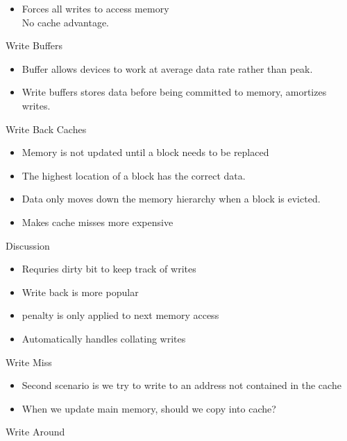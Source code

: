 \documentclass{report}
\begin{document}
\begin{description}
\begin{itemize}
            \item Forces all writes to access memory\\
                No cache advantage.
        \end{itemize}
    \item {\large Write Buffers}
        \begin{itemize}
            \item Buffer allows devices to work at average
                data rate rather than peak.
            \item Write buffers stores data before being committed
                to memory, amortizes writes.
        \end{itemize}
    \item {\large Write Back Caches}
        \begin{itemize}
            \item Memory is not updated until a block needs
                to be replaced
            \item The highest location of a block has the 
                correct data.
            \item Data only moves down the memory hierarchy when
                a block is evicted.
            \item Makes cache misses more expensive
        \end{itemize}
    \item {\large Discussion}
        \begin{itemize}
            \item Requries dirty bit to keep track of writes
            \item Write back is more popular
            \item penalty is only applied to next memory access
            \item Automatically handles collating writes
        \end{itemize}
    \item {\large Write Miss}
        \begin{itemize}
            \item Second scenario is we try to write
                to an address not contained in the cache
            \item When we update main memory, should we copy
                into cache?
        \end{itemize}
    \item {\large Write Around}
        \begin{itemize}

\end{itemize}
\end{description}
\end{document}
